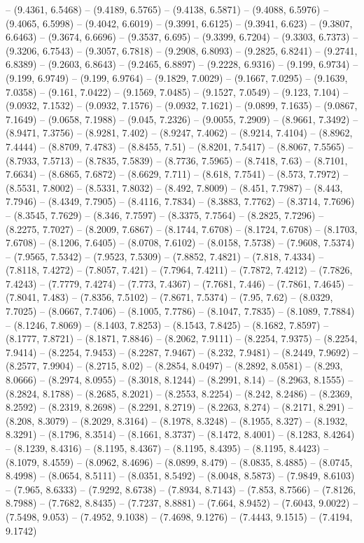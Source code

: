 -- (9.4361, 6.5468) -- (9.4189, 6.5765) -- (9.4138, 6.5871) -- (9.4088, 6.5976) -- (9.4065, 6.5998) -- (9.4042, 6.6019) -- (9.3991, 6.6125) -- (9.3941, 6.623) -- (9.3807, 6.6463) -- (9.3674, 6.6696) -- (9.3537, 6.695) -- (9.3399, 6.7204) -- (9.3303, 6.7373) -- (9.3206, 6.7543) -- (9.3057, 6.7818) -- (9.2908, 6.8093) -- (9.2825, 6.8241) -- (9.2741, 6.8389) -- (9.2603, 6.8643) -- (9.2465, 6.8897) -- (9.2228, 6.9316) -- (9.199, 6.9734) -- (9.199, 6.9749) -- (9.199, 6.9764) -- (9.1829, 7.0029) -- (9.1667, 7.0295) -- (9.1639, 7.0358) -- (9.161, 7.0422) -- (9.1569, 7.0485) -- (9.1527, 7.0549) -- (9.123, 7.104) -- (9.0932, 7.1532) -- (9.0932, 7.1576) -- (9.0932, 7.1621) -- (9.0899, 7.1635) -- (9.0867, 7.1649) -- (9.0658, 7.1988) -- (9.045, 7.2326) -- (9.0055, 7.2909) -- (8.9661, 7.3492) -- (8.9471, 7.3756) -- (8.9281, 7.402) -- (8.9247, 7.4062) -- (8.9214, 7.4104) -- (8.8962, 7.4444) -- (8.8709, 7.4783) -- (8.8455, 7.51) -- (8.8201, 7.5417) -- (8.8067, 7.5565) -- (8.7933, 7.5713) -- (8.7835, 7.5839) -- (8.7736, 7.5965) -- (8.7418, 7.63) -- (8.7101, 7.6634) -- (8.6865, 7.6872) -- (8.6629, 7.711) -- (8.618, 7.7541) -- (8.573, 7.7972) -- (8.5531, 7.8002) -- (8.5331, 7.8032) -- (8.492, 7.8009) -- (8.451, 7.7987) -- (8.443, 7.7946) -- (8.4349, 7.7905) -- (8.4116, 7.7834) -- (8.3883, 7.7762) -- (8.3714, 7.7696) -- (8.3545, 7.7629) -- (8.346, 7.7597) -- (8.3375, 7.7564) -- (8.2825, 7.7296) -- (8.2275, 7.7027) -- (8.2009, 7.6867) -- (8.1744, 7.6708) -- (8.1724, 7.6708) -- (8.1703, 7.6708) -- (8.1206, 7.6405) -- (8.0708, 7.6102) -- (8.0158, 7.5738) -- (7.9608, 7.5374) -- (7.9565, 7.5342) -- (7.9523, 7.5309) -- (7.8852, 7.4821) -- (7.818, 7.4334) -- (7.8118, 7.4272) -- (7.8057, 7.421) -- (7.7964, 7.4211) -- (7.7872, 7.4212) -- (7.7826, 7.4243) -- (7.7779, 7.4274) -- (7.773, 7.4367) -- (7.7681, 7.446) -- (7.7861, 7.4645) -- (7.8041, 7.483) -- (7.8356, 7.5102) -- (7.8671, 7.5374) -- (7.95, 7.62) -- (8.0329, 7.7025) -- (8.0667, 7.7406) -- (8.1005, 7.7786) -- (8.1047, 7.7835) -- (8.1089, 7.7884) -- (8.1246, 7.8069) -- (8.1403, 7.8253) -- (8.1543, 7.8425) -- (8.1682, 7.8597) -- (8.1777, 7.8721) -- (8.1871, 7.8846) -- (8.2062, 7.9111) -- (8.2254, 7.9375) -- (8.2254, 7.9414) -- (8.2254, 7.9453) -- (8.2287, 7.9467) -- (8.232, 7.9481) -- (8.2449, 7.9692) -- (8.2577, 7.9904) -- (8.2715, 8.02) -- (8.2854, 8.0497) -- (8.2892, 8.0581) -- (8.293, 8.0666) -- (8.2974, 8.0955) -- (8.3018, 8.1244) -- (8.2991, 8.14) -- (8.2963, 8.1555) -- (8.2824, 8.1788) -- (8.2685, 8.2021) -- (8.2553, 8.2254) -- (8.242, 8.2486) -- (8.2369, 8.2592) -- (8.2319, 8.2698) -- (8.2291, 8.2719) -- (8.2263, 8.274) -- (8.2171, 8.291) -- (8.208, 8.3079) -- (8.2029, 8.3164) -- (8.1978, 8.3248) -- (8.1955, 8.327) -- (8.1932, 8.3291) -- (8.1796, 8.3514) -- (8.1661, 8.3737) -- (8.1472, 8.4001) -- (8.1283, 8.4264) -- (8.1239, 8.4316) -- (8.1195, 8.4367) -- (8.1195, 8.4395) -- (8.1195, 8.4423) -- (8.1079, 8.4559) -- (8.0962, 8.4696) -- (8.0899, 8.479) -- (8.0835, 8.4885) -- (8.0745, 8.4998) -- (8.0654, 8.5111) -- (8.0351, 8.5492) -- (8.0048, 8.5873) -- (7.9849, 8.6103) -- (7.965, 8.6333) -- (7.9292, 8.6738) -- (7.8934, 8.7143) -- (7.853, 8.7566) -- (7.8126, 8.7988) -- (7.7682, 8.8435) -- (7.7237, 8.8881) -- (7.664, 8.9452) -- (7.6043, 9.0022) -- (7.5498, 9.053) -- (7.4952, 9.1038) -- (7.4698, 9.1276) -- (7.4443, 9.1515) -- (7.4194, 9.1742) 